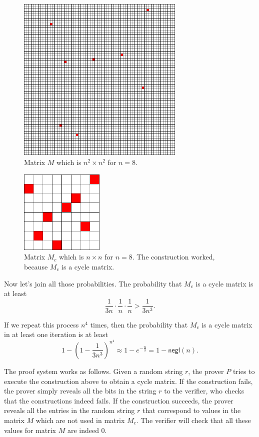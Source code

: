 \begin{figure}[ht]
	\centering
		\includegraphics[height=8cm]{n2.png}
	\caption{Matrix $M$ which is $n^2\times n^2$ for $n=8$.}
	\label{fig:n2}
\end{figure}

\begin{figure}[ht]
	\centering
		\includegraphics[height=4cm]{n.png}
	\caption{Matrix $M_c$ which is $n\times n$ for $n=8$. The construction worked,
	         because $M_c$ is a cycle matrix.}
	\label{fig:n}
\end{figure}


Now let's join all those probabilities. The probability that $M_c$ is a cycle matrix is at least
$$\frac{1}{3n}\cdot \frac{1}{n}\cdot \frac{1}{n} > \frac{1}{3n^3}.$$

If we repeat this process $n^4$ times, then the probability that $M_c$ is a cycle matrix in at least one iteration is at least
$$1-\left(1-\frac{1}{3n^3}\right)^{n^4}\approx 1-e^{-\frac{n}{3}} = 1-\mathsf{negl}(n).$$


\bigskip
The proof system works as follows. Given a random string $r$, the prover $P$ tries
to execute the construction above to obtain a cycle matrix.
If the construction fails, the prover simply reveals all the bits in the string $r$
to the verifier, who checks that the constructions indeed fails.
If the construction succeeds, the prover reveals all the entries in the random string $r$
that correspond to values in the matrix $M$ which are not used in matrix $M_c$.
The verifier will check that all these values for matrix $M$ are indeed 0.

